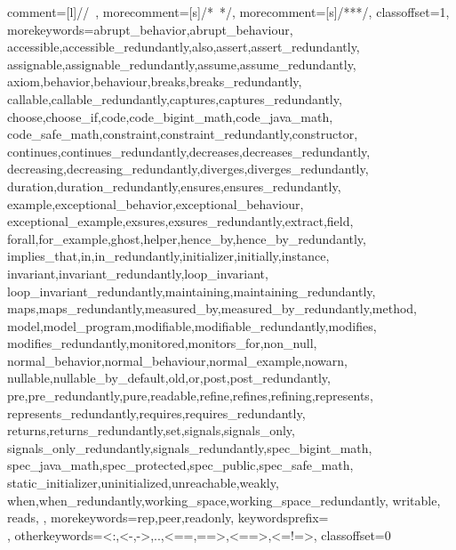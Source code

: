        {%
        comment=[l]{//\ },
        morecomment=[s]{/*\ }{*/},        
        morecomment=[s]{/**}{*/},
        classoffset=1,
        morekeywords={abrupt_behavior,abrupt_behaviour,
         accessible,accessible_redundantly,also,assert,assert_redundantly,
         assignable,assignable_redundantly,assume,assume_redundantly,
         axiom,behavior,behaviour,breaks,breaks_redundantly,
         callable,callable_redundantly,captures,captures_redundantly,
         choose,choose_if,code,code_bigint_math,code_java_math,
         code_safe_math,constraint,constraint_redundantly,constructor,
         continues,continues_redundantly,decreases,decreases_redundantly,
         decreasing,decreasing_redundantly,diverges,diverges_redundantly,
         duration,duration_redundantly,ensures,ensures_redundantly,
         example,exceptional_behavior,exceptional_behaviour,
         exceptional_example,exsures,exsures_redundantly,extract,field,
         forall,for_example,ghost,helper,hence_by,hence_by_redundantly,
         implies_that,in,in_redundantly,initializer,initially,instance,
         invariant,invariant_redundantly,loop_invariant,
         loop_invariant_redundantly,maintaining,maintaining_redundantly,
         maps,maps_redundantly,measured_by,measured_by_redundantly,method,
         model,model_program,modifiable,modifiable_redundantly,modifies,
         modifies_redundantly,monitored,monitors_for,non_null,
         normal_behavior,normal_behaviour,normal_example,nowarn,
         nullable,nullable_by_default,old,or,post,post_redundantly,
         pre,pre_redundantly,pure,readable,refine,refines,refining,represents,
         represents_redundantly,requires,requires_redundantly,
         returns,returns_redundantly,set,signals,signals_only,
         signals_only_redundantly,signals_redundantly,spec_bigint_math,
         spec_java_math,spec_protected,spec_public,spec_safe_math,
         static_initializer,uninitialized,unreachable,weakly,
         when,when_redundantly,working_space,working_space_redundantly,
         writable, 
         reads,
        },
        morekeywords={rep,peer,readonly},
        keywordsprefix=\\,
        otherkeywords={<:,<-,->,..,<==,==>,<==>,<=!=>},
        classoffset=0 %
}
